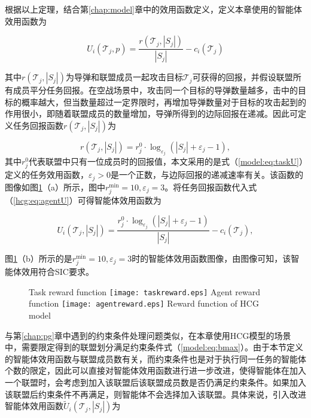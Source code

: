 根据以上定理，结合第\ref{chap:model}章中的效用函数定义，定义本章使用的智能体效用函数为

\begin{equation}
\label{hcg:eq:agentU}
	U_i(\mathcal{T}_j,p) = \frac{r(\mathcal{T}_j,|S_j|)}{|S_j|} - c_i(\mathcal{T}_j)
\end{equation}

其中$r(\mathcal{T}_j,|S_j|)$为导弹和联盟成员一起攻击目标$\mathcal{T}_j$可获得的回报，并假设联盟所有成员平分任务回报。在空战场景中，攻击同一个目标的导弹数量越多，击中的目标的概率越大，但当数量超过一定界限时，再增加导弹数量对于目标的攻击起到的作用很小，即随着联盟成员的数量增加，导弹所得到的边际回报在递减。因此可定义任务回报函数$r(\mathcal{T}_j,|S_j|)$为

\begin{equation}
\label{hcg:eq:task_reward}
	r(\mathcal{T}_j,|S_j|) = r_j^0 \cdot \log_{\varepsilon_j} (|S_j|+\varepsilon_j-1),
\end{equation}
其中$r_j^0$代表联盟中只有一位成员时的回报值，本文采用的是式（\ref{model:eq:taskU}）定义的任务效用函数，$\varepsilon_j>0$是一个正数，与边际回报的递减速率有关。该函数的图像如图\ref{hcg:fig:rewardfunc}（a）所示，图中$r_j^{\text{min}}=10, \varepsilon_j = 3$。将任务回报函数代入式（\ref{hcg:eq:agentU}）可得智能体效用函数为

\begin{equation}
\label{hcg:eq:agentU_reward}
	U_i(\mathcal{T}_j,|S_j|) = \frac{r_j^0 \cdot \log_{\varepsilon_j} (|S_j|+\varepsilon_j-1)}{|S_j|} - c_i(\mathcal{T}_j),
\end{equation}

图\ref{hcg:fig:rewardfunc}（b）所示的是$r_j^{\text{min}}=10,\varepsilon_j=3$时的智能体效用函数图像，由图像可知，该智能体效用符合SIC要求。

\begin{figure}[!hbtp]
  \centering
                  {Task reward function}%
                  {\texttt{[image: taskreward.eps]}}
                  {Agent reward function}%
                  {\texttt{[image: agentreward.eps]}}
            {Reward function of HCG model}
  \label{hcg:fig:rewardfunc}
\end{figure}

与第\ref{chap:pg}章中遇到的约束条件处理问题类似，在本章使用HCG模型的场景中，需要限定得到的联盟划分满足约束条件式（\ref{model:eq:bmax}）。由于本节定义的智能体效用函数与联盟成员数有关，而约束条件也是对于执行同一任务的智能体个数的限定，因此可以直接对智能体效用函数进行进一步改进，使得智能体在加入一个联盟时，会考虑到加入该联盟后该联盟成员数是否仍满足约束条件。如果加入该联盟后约束条件不再满足，则智能体不会选择加入该联盟。具体来说，引入改进智能体效用函数$\widetilde U_i(\mathcal{T}_j,|S_j|)$为

